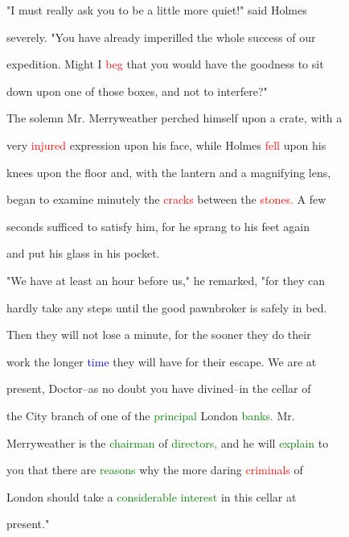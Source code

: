  "I must really ask you to be a little more \textcolor{BurntOrange}{quiet!"} said Holmes

 severely. "You have already imperilled the whole \textcolor{BurntOrange}{success} of our

 \textcolor{BurntOrange}{expedition.} Might I \textcolor{red}{beg} that you would have the \textcolor{BurntOrange}{goodness} to sit

 down upon one of those boxes, and not to interfere?"



 The solemn Mr. Merryweather perched himself upon a crate, with a

 very \textcolor{red}{injured} expression upon his face, while Holmes \textcolor{red}{fell} upon his

 knees upon the floor and, with the lantern and a magnifying lens,

 began to examine minutely the \textcolor{red}{cracks} between the \textcolor{red}{stones.} A few

 seconds sufficed to satisfy him, for he sprang to his feet again

 and put his glass in his pocket.



 "We have at least an hour before us," he remarked, "for they can

 hardly take any steps until the \textcolor{BurntOrange}{good} pawnbroker is safely in bed.

 Then they will not \textcolor{BurntOrange}{lose} a minute, for the sooner they do their

 work the longer \textcolor{blue}{time} they will have for their \textcolor{BurntOrange}{escape.} We are at

 \textcolor{BurntOrange}{present,} Doctor--as no \textcolor{BurntOrange}{doubt} you have divined--in the cellar of

 the City branch of one of the \textcolor{green}{principal} London \textcolor{green}{banks.} Mr.

 Merryweather is the \textcolor{green}{chairman} of \textcolor{green}{directors,} and he will \textcolor{green}{explain} to

 you that there are \textcolor{green}{reasons} why the more \textcolor{BurntOrange}{daring} \textcolor{red}{criminals} of

 London should take a \textcolor{green}{considerable} \textcolor{green}{interest} in this cellar at

 \textcolor{BurntOrange}{present."}



